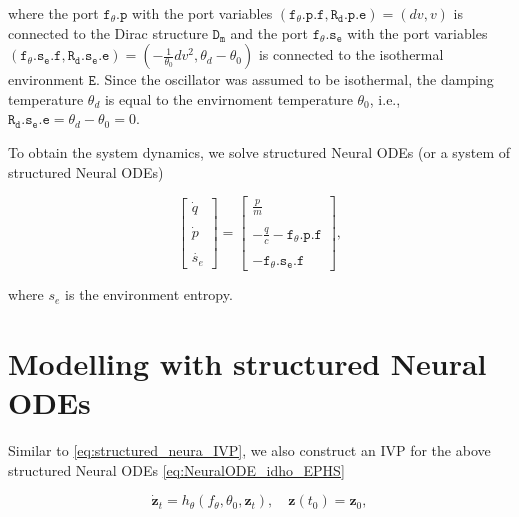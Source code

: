\documentclass[
	parskip, 			   %
	twoside, 			   %
	DIV=14, 			   %
	BCOR=15.0mm, 		   %
	headsepline, 		   %
	open=right, 		   %
	captions=tableheading, %
	bibliography=totoc,    %
	numbers=noenddot       %
]{scrreprt}
\begin{document}
where the port $\mathtt{f_{\theta}.p}$ with the port variables $(\mathtt{f_{\theta}.p.f}, \mathtt{R_{d}.p.e}) = (dv, v)$ is connected to the Dirac structure $\mathtt{D_m}$ and the port $\mathtt{f_{\theta}.s_{e}}$ with the port variables $(\mathtt{f_{\theta}.s_{e}.f}, \mathtt{R_{d}.s_{e}.e}) = (-\frac{1}{\theta_{0}}dv^2, \theta_{d}-\theta_{0})$ is connected to the isothermal environment $\mathtt{E}$. Since the oscillator was assumed to be isothermal, the damping temperature $\theta_{d}$ is equal to the envirnoment temperature $\theta_{0}$, i.e., $\mathtt{R_{d}.s_{e}.e} = \theta_{d}-\theta_{0} = 0$.

To obtain the system dynamics, we solve structured Neural ODEs (or a system of structured Neural ODEs)

\begin{equation}
    \label{eq:NeuralODE_idho_EPHS}
    \begin{bmatrix}
    \dot{q}\\\\
    \dot{p}\\\\
    \dot{s_e}
    \end{bmatrix}
    =
    \begin{bmatrix}
    \frac{p}{m}\\\\
    -\frac{q}{c}-\mathtt{f_{\theta}.p.f}\\\\
    -\mathtt{f_{\theta}.s_{e}.f}
    \end{bmatrix},
\end{equation}

where $s_e$ is the environment entropy.


\section{Modelling with structured Neural ODEs}

Similar to \ref{eq:structured_neura_IVP}, we also construct an IVP for the above structured Neural ODEs \ref{eq:NeuralODE_idho_EPHS}

\begin{equation}
    \label{eq:structured_neural_EPHS_IVP}
    \dot{\mathbf{z}}_t = h_{\theta}(f_{\theta}, \theta_0, \mathbf{z}_t), \quad \mathbf{z}(t_{0}) = \mathbf{z}_{0},
\end{equation}
\end{document}
